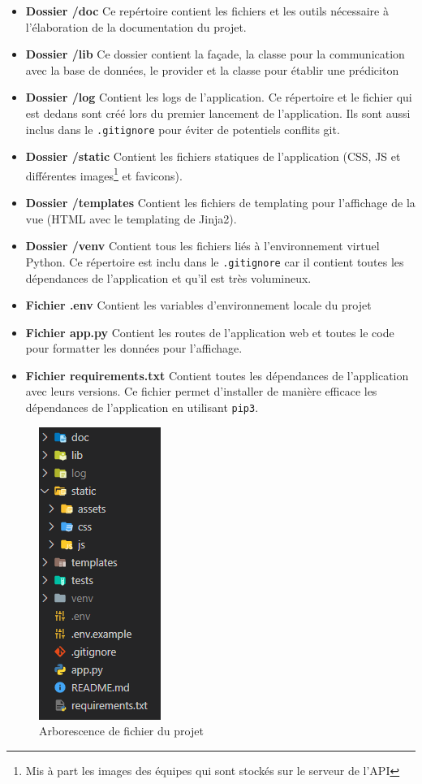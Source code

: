 \documentclass[a4paper,14pt]{extarticle}
\begin{document}
{\begin{itemize}
    \item \textbf{Dossier /doc} Ce repértoire contient les fichiers et les outils nécessaire à l'élaboration de la documentation du projet.
    \item \textbf{Dossier /lib} Ce dossier contient la façade, la classe pour la communication avec la base de données, le provider et la classe pour établir une prédiciton
    \item \textbf{Dossier /log} Contient les logs de l'application. Ce répertoire et le fichier qui est dedans sont créé lors du premier lancement de l'application. Ils sont aussi inclus dans le \texttt{.gitignore} pour éviter de potentiels conflits git.
    \item \textbf{Dossier /static} Contient les fichiers statiques de l'application (CSS, JS et différentes images\footnote{Mis à part les images des équipes qui sont stockés sur le serveur de l'API} et favicons).
    \item \textbf{Dossier /templates} Contient les fichiers de templating pour l'affichage de la vue (HTML avec le templating de Jinja2).
    \item \textbf{Dossier /venv} Contient tous les fichiers liés à l'environnement virtuel Python. Ce répertoire est inclu dans le \texttt{.gitignore} car il contient toutes les dépendances de l'application et qu'il est très volumineux.
    \item \textbf{Fichier .env} Contient les variables d'environnement locale du projet
    \item \textbf{Fichier app.py} Contient les routes de l'application web et toutes le code pour formatter les données pour l'affichage.
    \item \textbf{Fichier requirements.txt} Contient toutes les dépendances de l'application avec leurs versions. Ce fichier permet d'installer de manière efficace les dépendances de l'application en utilisant \texttt{pip3}.
\end{itemize}

\begin{figure}[htp]
    \centering
    \includegraphics{../img/arborescenceFichier.png}
    \caption{Arborescence de fichier du projet}
    \label{fig:arborescenceFichier}
\end{figure}

}
\end{document}
